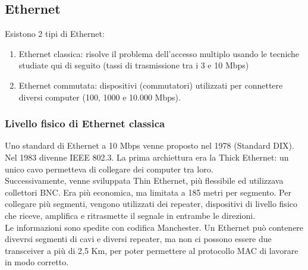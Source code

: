 \documentclass{article}
\begin{document}
\subsection{Ethernet}
Esistono 2 tipi di Ethernet:
\begin{enumerate}
\item Ethernet classica: risolve il problema dell'accesso multiplo usando le tecniche studiate qui di seguito (tassi di trasmissione tra i 3 e 10 Mbps)
\item Ethernet commutata: dispositivi (commutatori) utilizzati per connettere diversi computer (100, 1000 e 10.000 Mbps).
\end{enumerate}
\subsubsection{Livello fisico di Ethernet classica}
Uno standard di Ethernet a 10 Mbps venne proposto nel 1978 (Standard DIX). Nel 1983 divenne IEEE 802.3. La prima archiettura era la Thick Ethernet: un unico cavo permetteva di collegare dei computer tra loro.\\
Successivamente, venne sviluppata Thin Ethernet, più flessibile ed utilizzava collettori BNC. Era più economica, ma limitata a 185 metri per segmento. Per collegare più segmenti, vengono utilizzati dei repeater, dispositivi di livello fisico che riceve, amplifica e ritrasmette il segnale in entrambe le direzioni. \\
Le informazioni sono spedite con codifica Manchester.  Un Ethernet può contenere divevrsi segmenti di cavi e diversi repeater, ma non ci possono essere due transceiver a più di 2,5 Km, per poter permettere al protocollo MAC di lavorare in modo corretto.
\end{document}
